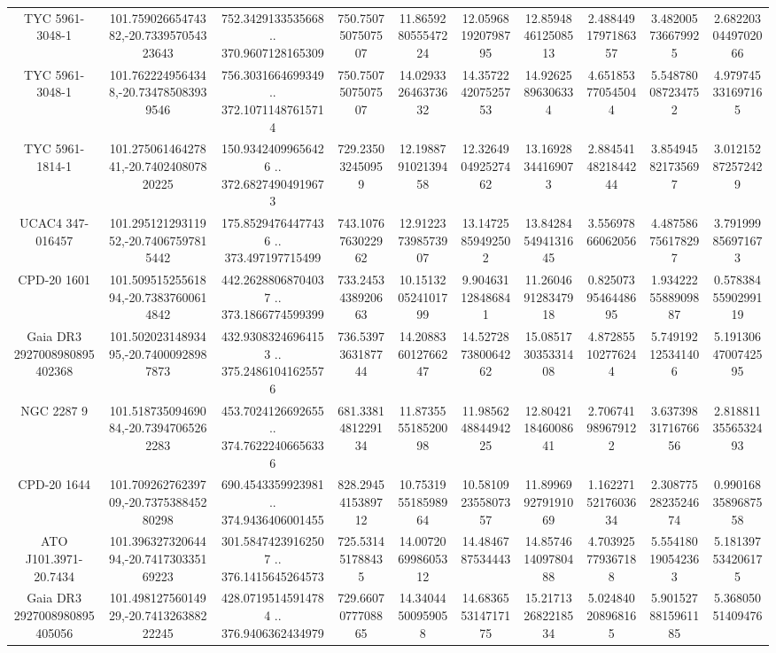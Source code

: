 \begin{table}
\begin{tabular}{cccccccccc}
TYC 5961-3048-1 & 101.75902665474382,-20.733957054323643 & 752.3429133535668 .. 370.9607128165309 & 750.7507507507507 & 11.865928055547224 & 12.059681920798795 & 12.859484612508513 & 2.4884491797186357 & 3.482005736679925 & 2.6822030449702066 \\
TYC 5961-3048-1 & 101.7622249564348,-20.734785083939546 & 756.3031664699349 .. 372.10711487615714 & 750.7507507507507 & 14.029332646373632 & 14.357224207525753 & 14.92625896306334 & 4.651853770545044 & 5.548780087234752 & 4.979745331697165 \\
TYC 5961-1814-1 & 101.27506146427841,-20.740240807820225 & 150.93424099656426 .. 372.68274904919673 & 729.235032450959 & 12.198879102139458 & 12.326490492527462 & 13.16928344169073 & 2.8845414821844244 & 3.854945821735697 & 3.012152872572429 \\
UCAC4 347-016457 & 101.29512129311952,-20.74067597815442 & 175.85294764477436 .. 373.497197715499 & 743.1076763022962 & 12.912237398573907 & 13.14725859492502 & 13.842845494131645 & 3.55697866062056 & 4.487586756178297 & 3.791999856971673 \\
CPD-20  1601 & 101.50951525561894,-20.73837600614842 & 442.26288068704037 .. 373.1866774599399 & 733.2453438920663 & 10.151320524101799 & 9.904631128486841 & 11.260469128347918 & 0.8250739546448695 & 1.9342225588909887 & 0.5783845590299119 \\
Gaia DR3 2927008980895402368 & 101.50202314893495,-20.74000928987873 & 432.93083246964153 .. 375.24861041625576 & 736.5397363187744 & 14.208836012766247 & 14.527287380064262 & 15.085173035331408 & 4.872855102776244 & 5.749192125341406 & 5.1913064700742595 \\
NGC  2287     9 & 101.51873509469084,-20.73947065262283 & 453.7024126692655 .. 374.76222406656336 & 681.3381481229134 & 11.873555518520098 & 11.985624884494225 & 12.804211846008641 & 2.706741989679122 & 3.6373983171676656 & 2.8188113556532493 \\
CPD-20  1644 & 101.70926276239709,-20.737538845280298 & 690.4543359923981 .. 374.9436406001455 & 828.2945415389712 & 10.753195518598964 & 10.581092355807357 & 11.899699279191069 & 1.1622715217603634 & 2.3087752823524674 & 0.9901683589687558 \\
ATO J101.3971-20.7434 & 101.39632732064494,-20.741730335169223 & 301.58474239162507 .. 376.1415645264573 & 725.531451788435 & 14.007206998605312 & 14.4846787534443 & 14.857461409780488 & 4.703925779367188 & 5.554180190542363 & 5.181397534206175 \\
Gaia DR3 2927008980895405056 & 101.49812756014929,-20.741326388222245 & 428.07195145914784 .. 376.9406362434979 & 729.6607077708865 & 14.34044500959058 & 14.683655314717175 & 15.217132682218534 & 5.024840208968165 & 5.9015278815961185 & 5.36805051409476 \\

\end{tabular}
\end{table}

